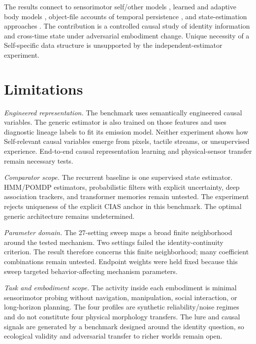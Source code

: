 \documentclass[journal]{IEEEtran}
\begin{document}
The results connect to sensorimotor self/other models \cite{Lanillos2017,Lanillos2020,Oliver2022,Chen2026}, learned and adaptive body models \cite{Bongard2006,Hu2025}, object-file accounts of temporal persistence \cite{Kahneman1992}, and state-estimation approaches \cite{Kalman1960,Rabiner1989,Kaelbling1998}. The contribution is a controlled causal study of identity information and cross-time state under adversarial embodiment change. Unique necessity of a Self-specific data structure is unsupported by the independent-estimator experiment.

\section{Limitations}
\noindent\emph{Engineered representation.} The benchmark uses semantically engineered causal variables. The generic estimator is also trained on those features and uses diagnostic lineage labels to fit its emission model. Neither experiment shows how Self-relevant causal variables emerge from pixels, tactile streams, or unsupervised experience. End-to-end causal representation learning \cite{Scholkopf2021} and physical-sensor transfer remain necessary tests.

\noindent\emph{Comparator scope.} The recurrent baseline is one supervised state estimator. HMM/POMDP estimators, probabilistic filters with explicit uncertainty, deep association trackers, and transformer memories remain untested. The experiment rejects uniqueness of the explicit CIAS anchor in this benchmark. The optimal generic architecture remains undetermined.

\noindent\emph{Parameter domain.} The 27-setting sweep maps a broad finite neighborhood around the tested mechanism. Two settings failed the identity-continuity criterion. The result therefore concerns this finite neighborhood; many coefficient combinations remain untested. Endpoint weights were held fixed because this sweep targeted behavior-affecting mechanism parameters.

\noindent\emph{Task and embodiment scope.} The activity inside each embodiment is minimal sensorimotor probing without navigation, manipulation, social interaction, or long-horizon planning. The four profiles are synthetic reliability/noise regimes and do not constitute four physical morphology transfers. The lure and causal signals are generated by a benchmark designed around the identity question, so ecological validity and adversarial transfer to richer worlds remain open.
\end{document}
